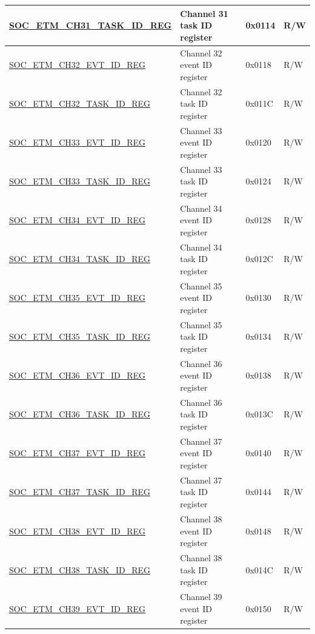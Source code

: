 \begin{longtable}{ | p{6cm} | p{6.2cm} | p{1.3cm} | p{2cm} | }
\hyperref[regdesc:SOCETMCHNTASKIDREG]{SOC\_ETM\_CH31\_TASK\_ID\_REG} & Channel 31 task ID register & 0x0114 & R/W \\ \hline
\hyperref[regdesc:SOCETMCHNEVTIDREG]{SOC\_ETM\_CH32\_EVT\_ID\_REG} & Channel 32 event ID register & 0x0118 & R/W \\ \hline
\hyperref[regdesc:SOCETMCHNTASKIDREG]{SOC\_ETM\_CH32\_TASK\_ID\_REG} & Channel 32 task ID register & 0x011C & R/W \\ \hline
\hyperref[regdesc:SOCETMCHNEVTIDREG]{SOC\_ETM\_CH33\_EVT\_ID\_REG} & Channel 33 event ID register & 0x0120 & R/W \\ \hline
\hyperref[regdesc:SOCETMCHNTASKIDREG]{SOC\_ETM\_CH33\_TASK\_ID\_REG} & Channel 33 task ID register & 0x0124 & R/W \\ \hline
\hyperref[regdesc:SOCETMCHNEVTIDREG]{SOC\_ETM\_CH34\_EVT\_ID\_REG} & Channel 34 event ID register & 0x0128 & R/W \\ \hline
\hyperref[regdesc:SOCETMCHNTASKIDREG]{SOC\_ETM\_CH34\_TASK\_ID\_REG} & Channel 34 task ID register & 0x012C & R/W \\ \hline
\hyperref[regdesc:SOCETMCHNEVTIDREG]{SOC\_ETM\_CH35\_EVT\_ID\_REG} & Channel 35 event ID register & 0x0130 & R/W \\ \hline
\hyperref[regdesc:SOCETMCHNTASKIDREG]{SOC\_ETM\_CH35\_TASK\_ID\_REG} & Channel 35 task ID register & 0x0134 & R/W \\ \hline
\hyperref[regdesc:SOCETMCHNEVTIDREG]{SOC\_ETM\_CH36\_EVT\_ID\_REG} & Channel 36 event ID register & 0x0138 & R/W \\ \hline
\hyperref[regdesc:SOCETMCHNTASKIDREG]{SOC\_ETM\_CH36\_TASK\_ID\_REG} & Channel 36 task ID register & 0x013C & R/W \\ \hline
\hyperref[regdesc:SOCETMCHNEVTIDREG]{SOC\_ETM\_CH37\_EVT\_ID\_REG} & Channel 37 event ID register & 0x0140 & R/W \\ \hline
\hyperref[regdesc:SOCETMCHNTASKIDREG]{SOC\_ETM\_CH37\_TASK\_ID\_REG} & Channel 37 task ID register & 0x0144 & R/W \\ \hline
\hyperref[regdesc:SOCETMCHNEVTIDREG]{SOC\_ETM\_CH38\_EVT\_ID\_REG} & Channel 38 event ID register & 0x0148 & R/W \\ \hline
\hyperref[regdesc:SOCETMCHNTASKIDREG]{SOC\_ETM\_CH38\_TASK\_ID\_REG} & Channel 38 task ID register & 0x014C & R/W \\ \hline
\hyperref[regdesc:SOCETMCHNEVTIDREG]{SOC\_ETM\_CH39\_EVT\_ID\_REG} & Channel 39 event ID register & 0x0150 & R/W \\ \hline

\end{longtable}
